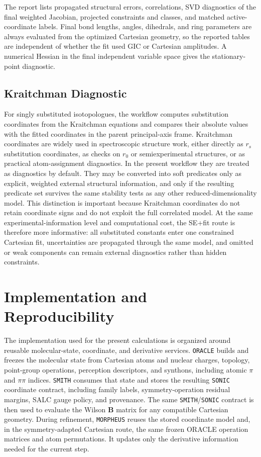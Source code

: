 \documentclass[aip,jcp,reprint,longbibliography,floatfix]{revtex4-2}
\begin{document}
The report lists propagated structural errors, correlations, SVD diagnostics of
the final weighted Jacobian, projected constraints and classes, and matched
active-coordinate labels. Final bond lengths, angles, dihedrals, and ring
parameters are always evaluated from the optimized Cartesian geometry, so the
reported tables are independent of whether the fit used GIC or Cartesian
amplitudes. A numerical Hessian in the final independent variable space gives
the stationary-point diagnostic.


\subsection{Kraitchman Diagnostic}

For singly substituted isotopologues, the workflow computes substitution
coordinates from the Kraitchman equations\cite{Kraitchman1953} and compares
their absolute values with the fitted coordinates in the parent principal-axis
frame. Kraitchman coordinates are widely used in spectroscopic structure work,
either directly as $r_s$ substitution coordinates, as checks on $r_0$ or
semiexperimental structures, or as practical atom-assignment diagnostics. In
the present workflow they are treated as diagnostics by default. They may be
converted into soft predicates only as explicit, weighted external structural
information, and only if the resulting predicate set survives the same
stability tests as any other reduced-dimensionality model. This distinction is
important because Kraitchman coordinates do not retain coordinate signs and do
not exploit the full correlated model. At the same experimental-information
level and computational cost, the SE+fit route is therefore more informative:
all substituted constants enter one constrained Cartesian fit, uncertainties
are propagated through the same model, and omitted or weak components can
remain external diagnostics rather than hidden constraints.


\section{Implementation and Reproducibility}

The implementation used for the present calculations is organized around
reusable molecular-state, coordinate, and derivative services. \texttt{ORACLE}
builds and freezes the molecular state from Cartesian atoms and nuclear
charges, topology, point-group operations, perception descriptors, and
synthons, including atomic $\pi$ and $\pi\pi$ indices.  \texttt{SMITH}
consumes that state and stores the resulting
\texttt{SONIC} coordinate contract,
including family labels, symmetry-operation residual margins, SALC gauge
policy, and provenance. The same \texttt{SMITH}/\texttt{SONIC} contract is
then used to evaluate the Wilson $\mathbf{B}$ matrix for any compatible
Cartesian geometry. During refinement, \texttt{MORPHEUS} reuses the stored
coordinate model and, in the symmetry-adapted Cartesian route, the same frozen ORACLE
operation matrices and atom permutations.  It updates only the derivative
information needed for the current step.
\end{document}
